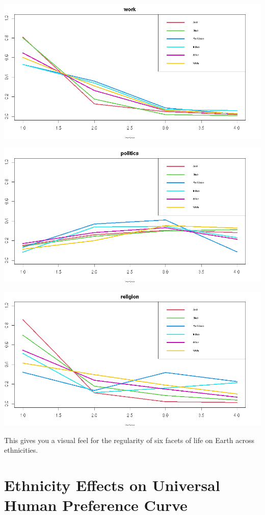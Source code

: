 \documentclass{amsart}
\begin{document}
\includegraphics[scale=0.6]{ethwork.jpeg}

\includegraphics[scale=0.6]{ethpol.jpeg}

\includegraphics[scale=0.6]{ethrel.jpeg}

This gives you a visual feel for the regularity of six facets of life on Earth across ethnicities.


\section{Ethnicity Effects on Universal Human Preference Curve}
\end{document}
